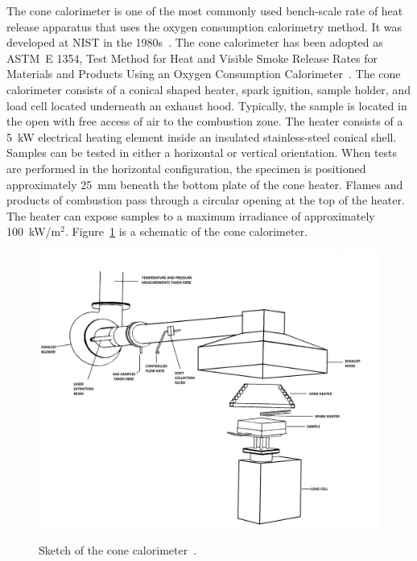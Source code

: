\documentclass[twoside]{uocthesis}
\begin{document}
{The cone calorimeter is one of the most commonly used bench-scale rate of heat release apparatus that uses the oxygen consumption calorimetry method. It was developed at NIST in the 1980s~\cite{babrauskas:1984}. The cone calorimeter has been adopted as ASTM~E 1354, Test Method for Heat and Visible Smoke Release Rates for Materials and Products Using an Oxygen Consumption Calorimeter~\cite{ASTM_E1354}. The cone calorimeter consists of a conical shaped heater, spark ignition, sample holder, and load cell located underneath an exhaust hood. Typically, the sample is located in the open with free access of air to the combustion zone. The heater consists of a 5~kW electrical heating element inside an insulated stainless-steel conical shell. Samples can be tested in either a horizontal or vertical orientation. When tests are performed in the horizontal configuration, the specimen is positioned approximately 25~mm beneath the bottom plate of the cone heater. Flames and products of combustion pass through a circular opening at the top of the heater. The heater can expose samples to a maximum irradiance of approximately 100~kW/m$^2$. Figure~\ref{Cone_Cal} is a schematic of the cone calorimeter.

\begin{figure}
	\centering
	\includegraphics[width=\textwidth]{../Figures/Cone_Cal} \\
	\caption[Sketch of the cone calorimeter]{Sketch of the cone calorimeter~\cite{babrauskas:1984}.}
	\label{Cone_Cal}
\end{figure}

}
\end{document}
